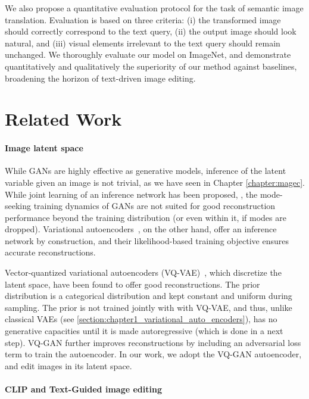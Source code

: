 We also propose a quantitative evaluation protocol for the task of semantic image 
translation. 
Evaluation is based on three criteria: (i) the transformed image should correctly 
correspond to the text query, (ii) the output image should look natural,  and (iii) 
visual elements irrelevant to the text query should remain unchanged. 
We thoroughly evaluate our model on ImageNet, and  demonstrate quantitatively and 
qualitatively the superiority of our method against baselines, broadening the horizon 
of text-driven image editing.


\section{Related Work}


\paragraph{Image latent space}
While GANs are highly effective as generative models, inference of the latent variable 
given an image is not trivial, as we have seen in Chapter \ref{chapter:magec}. 
While joint learning of an inference network has been proposed, \citep{donahue17iclr,dumoulin17iclr}, 
the mode-seeking training dynamics of GANs are 
 not suited for good reconstruction performance beyond the training distribution 
 (or even within it, if modes are dropped).
Variational autoencoders~\cite{Kingma2014}, on the other hand, offer an inference 
network by construction, and their likelihood-based training objective ensures accurate 
reconstructions.

Vector-quantized  variational autoencoders (VQ-VAE)~\cite{oord17nips,razavi2019generating},
 which discretize the latent space, have been found to offer good reconstructions. The prior distribution
 is a categorical distribution and kept constant and uniform during sampling.
 The prior is not trained jointly with with VQ-VAE, and thus, unlike classical \ac{VAE}s (see \ref{section:chapter1_variational_auto_encoders}),
 has no generative capacities until it is made autoregressive (which is done in a next step). 
VQ-GAN \citep{esser2021taming,yu2021vector} further improves reconstructions 
by  including an adversarial loss term to train the autoencoder.
In our work,  we adopt the VQ-GAN autoencoder,  and edit  images in its latent space.



\paragraph{CLIP and Text-Guided image editing}

